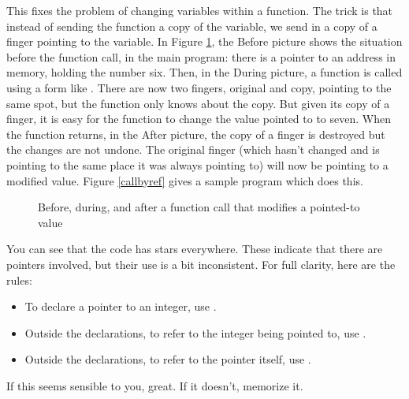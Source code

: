 \documentclass[12pt]{article}
\begin{document}
This fixes the problem of changing variables within a function. The
trick is that instead of sending the function a copy of the variable,
we send in a copy of a finger pointing to the variable. 
In Figure \ref{fingerfig}, the Before picture shows the situation
before the function call, in the main program: there is a pointer to an
address in memory, holding the number six. Then, in the During picture,
a function is called using a form like .
There are now
two fingers, original and copy, pointing to the same spot, but the
function only knows about the copy.  But given its copy of a finger, it
is easy for the function to change the value pointed to to seven. When
the function returns, in the After picture, the copy of a finger is
destroyed but the changes are not undone.  The original finger (which
hasn't changed and is pointing to the same place it was always pointing
to) will now be pointing to a modified value.  Figure \ref{callbyref}
gives a sample program which does this.

\begin{figure}
\caption{Before, during, and after a function call that modifies a pointed-to value}
\label{fingerfig}
\end{figure}


You can see that the code has stars everywhere. These
indicate that there are pointers involved, but their use is a bit inconsistent.
For full clarity, here are the rules:
\begin{itemize}
\item To declare a pointer to an integer, use .
\item Outside the declarations, to refer to the integer being pointed to, use .
\item Outside the declarations, to refer to the pointer itself, use
.
\end{itemize}
If this seems sensible to you, great. If it doesn't, memorize it. 
\end{document}
